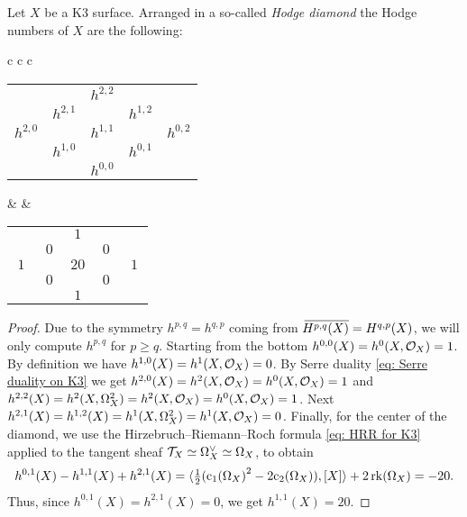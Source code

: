 \begin{proposition}
    \emph{\cite[\S 1.2.4]{Huybrechts2016}}
    Let $X$ be a K3 surface. Arranged in a so-called \emph{Hodge diamond} the Hodge numbers of $X$ are the following:
    \begin{center}
        \begin{tabular}{c c c}
            \begin{tabular}{ccccc}
                &  & $h^{2,2}$ &  &  \\
                & $h^{2,1}$ &  & $h^{1,2}$ &  \\
                $h^{2,0}$ &  & $h^{1,1}$ &  & $h^{0,2}$ \\
                & $h^{1,0}$ &  & $h^{0,1}$ &  \\
                &  & $h^{0,0}$ &  &  \\
            \end{tabular} & \qquad &
            \begin{tabular}{ccccc}
                &  & $\ 1 \ $ &  &  \\
                & $\ 0 \ $ &  & $\ 0 \ $ &  \\
                $\ 1 \ $ &  & $20$ &  & $\ 1 \ $ \\
                & $0$ &  & $0$ &  \\
                &  & $1$ &  &  \\
            \end{tabular}
        \end{tabular}
    \end{center}
\end{proposition}

\begin{proof}
    Due to the symmetry $h^{p,q} = h^{q,p}$ coming from $\,\overline{\!{H^{p,q}(X)}} = H^{q,p}(X)$, we will only compute $h^{p,q}$ for $p \geq q$. Starting from the bottom $h^{0,0}(X) = h^0(X, {\mathcal{O}_{X}}) = 1$. By definition we have $h^{1,0}(X) = h^1(X, {\mathcal{O}_{X}}) = 0$. By Serre duality \eqref{eq: Serre duality on K3} we get $h^{2,0}(X) = h^2(X, {\mathcal{O}_{X}}) = h^{0}(X, {\mathcal{O}_{X}}) = 1$ and $h^{2,2}(X) = h^{2}(X, \Omega_X^2) = h^2(X, {\mathcal{O}_{X}}) = h^0(X, {\mathcal{O}_{X}}) = 1$. Next $h^{2,1}(X) = h^{1,2}(X) = h^1(X, \Omega_X^2) = h^1(X, {\mathcal{O}_{X}}) = 0$. Finally, for the center of the diamond, we use the Hirzebruch--Riemann--Roch formula \eqref{eq: HRR for K3} applied to the tangent sheaf $\mathcal{T}_{X} \simeq \Omega_X^\vee \simeq \Omega_X$, to obtain
    \begin{align*}
        h^{0,1}(X) - h^{1,1}(X) + h^{2,1}(X) 
        =\pairing{\tfrac{1}{2}(\cclass[1]{\Omega_X}^2 - 2\cclass[2]{\Omega_X})}{[X]} + 2 \rk{\Omega_X} = -20.
    \end{align*}
    Thus, since $h^{0,1}(X) = h^{2,1}(X) = 0$, we get $h^{1,1}(X) = 20$.
\end{proof}

